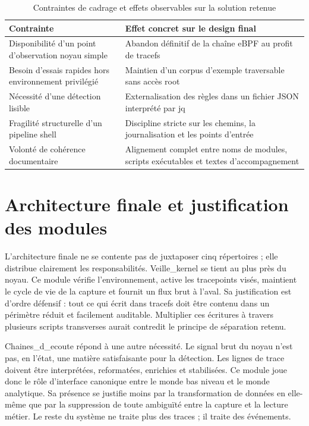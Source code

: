 \documentclass[12pt,a4paper]{report}
\begin{document}
\begin{table}[h]
\centering
\begin{tabular}{>{\raggedright\arraybackslash}p{4cm} >{\raggedright\arraybackslash}p{9cm}}
\toprule
Contrainte & Effet concret sur le design final \\
\midrule
Disponibilité d’un point d’observation noyau simple & Abandon définitif de la chaîne eBPF au profit de tracefs \\
Besoin d’essais rapides hors environnement privilégié & Maintien d’un corpus d’exemple traversable sans accès root \\
Nécessité d’une détection lisible & Externalisation des règles dans un fichier JSON interprété par jq \\
Fragilité structurelle d’un pipeline shell & Discipline stricte sur les chemins, la journalisation et les points d’entrée \\
Volonté de cohérence documentaire & Alignement complet entre noms de modules, scripts exécutables et textes d’accompagnement \\
\bottomrule
\end{tabular}
\caption{Contraintes de cadrage et effets observables sur la solution retenue}
\end{table}

\chapter{Architecture finale et justification des modules}
L’architecture finale ne se contente pas de juxtaposer cinq répertoires ; elle distribue clairement les responsabilités. Veille\_kernel se tient au plus près du noyau. Ce module vérifie l’environnement, active les tracepoints visés, maintient le cycle de vie de la capture et fournit un flux brut à l’aval. Sa justification est d’ordre défensif : tout ce qui écrit dans tracefs doit être contenu dans un périmètre réduit et facilement auditable. Multiplier ces écritures à travers plusieurs scripts transverses aurait contredit le principe de séparation retenu.

Chaines\_d\_ecoute répond à une autre nécessité. Le signal brut du noyau n’est pas, en l’état, une matière satisfaisante pour la détection. Les lignes de trace doivent être interprétées, reformatées, enrichies et stabilisées. Ce module joue donc le rôle d’interface canonique entre le monde bas niveau et le monde analytique. Sa présence se justifie moins par la transformation de données en elle-même que par la suppression de toute ambiguïté entre la capture et la lecture métier. Le reste du système ne traite plus des traces ; il traite des événements.
\end{document}
